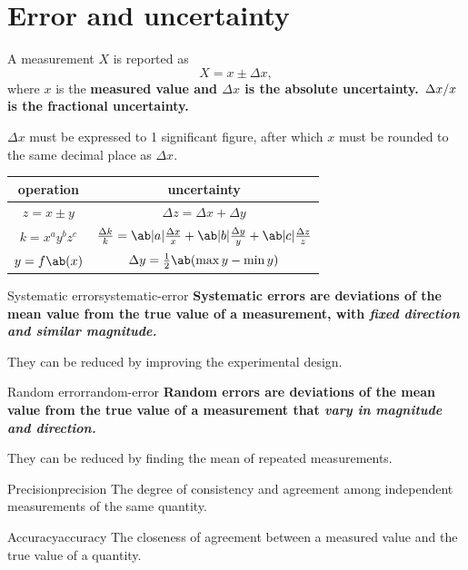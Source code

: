 \section{Error and uncertainty}
A measurement \(X\) is reported as
\begin{equation*}
	X = x \pm \Delta x,
\end{equation*}
where \(x\) is the \bf{measured value} and \(\Delta x\) is the \bf{absolute uncertainty}.
\(\lf{\Delta x}{x}\) is the \bf{fractional uncertainty}.

\(\Delta x\) must be expressed to 1 significant figure, after which \(x\) must be rounded to the same decimal place as \(\Delta x\).
\begin{table}[htpb]
	\centering
	\begin{tabular}{c c}
		\toprule
		operation         & uncertainty                                                                                 \\
		\midrule
		\(z = x\pm y\)    & \(\Delta z = \Delta x + \Delta y\)                                                          \\
		\(k = x^ay^bz^c\) & \(\f{\Delta k}{k} = \ab|a|\f{\Delta x}{x} + \ab|b|\f{\Delta y}{y} + \ab|c|\f{\Delta z}{z}\) \\
		\(y = f\ab(x)\)   & \(\Delta y = \f{1}{2}\ab(\max y - \min y)\)                                                 \\
		\bottomrule
	\end{tabular}
	\label{eq:uncertainty}
\end{table}

\begin{definition}{Systematic error}{systematic-error}
	\bf{Systematic errors} are deviations of the mean value from the true value of a measurement, with \it{fixed direction}
	and \it{similar magnitude}.

	They can be reduced by improving the experimental design.
\end{definition}
\begin{definition}{Random error}{random-error}
	\bf{Random errors} are deviations of the mean value from the true value of a measurement
	that \it{vary in magnitude and direction}.

	They can be reduced by finding the mean of repeated measurements.
\end{definition}
\begin{definition}{Precision}{precision}
	The degree of consistency and agreement among independent measurements of the same quantity.
\end{definition}
\begin{definition}{Accuracy}{accuracy}
	The closeness of agreement between a measured value and the true value of a quantity.
\end{definition}